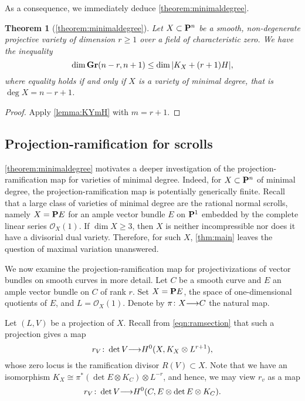 \documentclass[11pt,reqno]{amsart}
\theoremstyle{plain}
\newtheorem{theorem}{Theorem}[section]
\theoremstyle{definition}
\theoremstyle{remark}
\numberwithin{equation}{section}
\renewcommand{\to}{{\longrightarrow}}
\numberwithin{equation}{section}
\renewcommand{\O}{\mathcal O}
\begin{document}
As a consequence, we immediately deduce \autoref{theorem:minimaldegree}.
\begin{theorem}[\autoref{theorem:minimaldegree}]
  Let $X \subset \P^n$ be a smooth, non-degenerate projective variety of dimension $r \geq 1$ over a field of characteristic zero.
  We have the inequality
  \[ \dim \Gr(n-r, n+1) \leq \dim |K_X + (r+1)H|,\]
  where equality holds if and only if $X$ is a variety of minimal degree, that is $\deg X = n-r+1$.
\end{theorem}
\begin{proof}
  Apply \autoref{lemma:KYmH} with $m = r+1$.
\end{proof}

\subsection{Projection-ramification for scrolls}
\autoref{theorem:minimaldegree} motivates a deeper investigation of the projection-ramification map for varieties of minimal degree.
Indeed, for $X \subset \P^n$ of minimal degree, the projection-ramification map is potentially generically finite.
Recall that a large class of varieties of minimal degree are the rational normal scrolls, namely $X = \P E$ for an ample vector bundle $E$ on $\P^1$ embedded by the complete linear series $\O_X(1)$.
If $\dim X \geq 3$, then $X$ is neither incompressible nor does it have a divisorial dual variety.
Therefore, for such $X$, \autoref{thm:main} leaves the question of maximal variation unanswered.

We now examine the projection-ramification map for projectivizations of vector bundles on smooth curves in more detail.
Let $C$ be a smooth curve and $E$ an ample vector bundle on $C$ of rank $r$.
Set $X = \P E$, the space of one-dimensional quotients of $E$, and $L = \O_X(1)$.
Denote by $\pi \from X \to C$ the natural map.

Let $(L, V)$ be a projection of $X$.
Recall from \eqref{eqn:ramsection} that such a projection gives a map
\[ r_V \from \det V \to H^0(X, K_X \otimes L^{r+1}),\]
whose zero locus is the ramification divisor $R(V) \subset X$.
Note that we have an isomorphism $K_X \cong \pi^* (\det E \otimes K_C) \otimes L^{-r}$, and hence, we may view $r_v$ as a map
\[ r_V \from \det V \to H^0(C, E \otimes \det E \otimes K_C).\]
\end{document}
